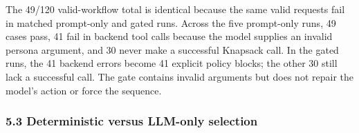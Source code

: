\documentclass[
  10pt,
  letterpaper,
]{article}
\begin{document}
The 49/120 valid-workflow total is identical because the same valid
requests fail in matched prompt-only and gated runs. Across the five
prompt-only runs, 49 cases pass, 41 fail in backend tool calls because
the model supplies an invalid persona argument, and 30 never make a
successful Knapsack call. In the gated runs, the 41 backend errors
become 41 explicit policy blocks; the other 30 still lack a successful
call. The gate contains invalid arguments but does not repair the
model's action or force the sequence.

\subsubsection{5.3 Deterministic versus LLM-only
selection}\label{deterministic-versus-llm-only-selection}
\end{document}
